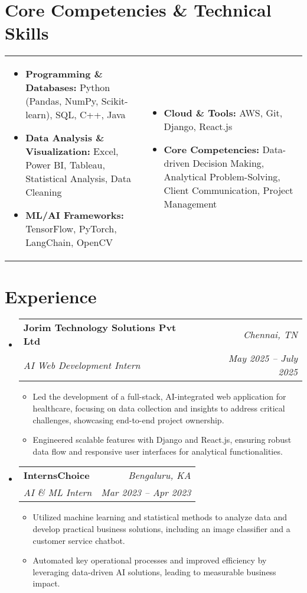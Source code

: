 \documentclass[letterpaper,10pt]{article}
\makeatletter
\newcommand{\resumeItem}[1]{\item\small{#1\vspace{-2pt}}}
\newcommand{\resumeSubheading}[4]{
  \vspace{-2pt}\item
    \begin{tabular*}{0.97\textwidth}[t]{l@{\extracolsep{\fill}}r}
      \textbf{#1} & \textit{\small#2} \\
      \textit{\small#3} & \textit{\small #4} \\
    \end{tabular*}\vspace{-5pt}
}
\newcommand{\resumeSubHeadingListStart}{\begin{itemize}[leftmargin=0.15in, label={}]}
\newcommand{\resumeSubHeadingListEnd}{\end{itemize}}
\newcommand{\resumeItemListStart}{\begin{itemize}[leftmargin=0.15in, itemsep=-3pt, topsep=0pt]}
\newcommand{\resumeItemListEnd}{\end{itemize}\vspace{-5pt}}
\makeatother
\begin{document}
\section{Core Competencies \& Technical Skills}
\begin{tabular*}{\textwidth}{@{}p{}p{}}
    \begin{itemize}[leftmargin=0.15in, label={$\bullet$}, itemsep=0pt]
        \item \textbf{Programming \& Databases:} Python (Pandas, NumPy, Scikit-learn), SQL, C++, Java
        \item \textbf{Data Analysis \& Visualization:} Excel, Power BI, Tableau, Statistical Analysis, Data Cleaning
        \item \textbf{ML/AI Frameworks:} TensorFlow, PyTorch, LangChain, OpenCV
    \end{itemize} &
    \begin{itemize}[leftmargin=0.15in, label={$\bullet$}, itemsep=0pt]
        \item \textbf{Cloud \& Tools:} AWS, Git, Django, React.js
        \item \textbf{Core Competencies:} Data-driven Decision Making, Analytical Problem-Solving, Client Communication, Project Management
    \end{itemize}
\end{tabular*}

\section{Experience}
\resumeSubHeadingListStart
    \resumeSubheading
    {Jorim Technology Solutions Pvt Ltd}{Chennai, TN}
    {AI Web Development Intern}{May 2025 -- July 2025}
    \resumeItemListStart
        \resumeItem{Led the development of a full-stack, AI-integrated web application for healthcare, focusing on data collection and insights to address critical challenges, showcasing end-to-end project ownership.}
        \resumeItem{Engineered scalable features with Django and React.js, ensuring robust data flow and responsive user interfaces for analytical functionalities.}
    \resumeItemListEnd

    \resumeSubheading
    {InternsChoice}{Bengaluru, KA}
    {AI \& ML Intern}{Mar 2023 -- Apr 2023}
    \resumeItemListStart
        \resumeItem{Utilized machine learning and statistical methods to analyze data and develop practical business solutions, including an image classifier and a customer service chatbot.}
        \resumeItem{Automated key operational processes and improved efficiency by leveraging data-driven AI solutions, leading to measurable business impact.}
    \resumeItemListEnd
\resumeSubHeadingListEnd
\end{document}
